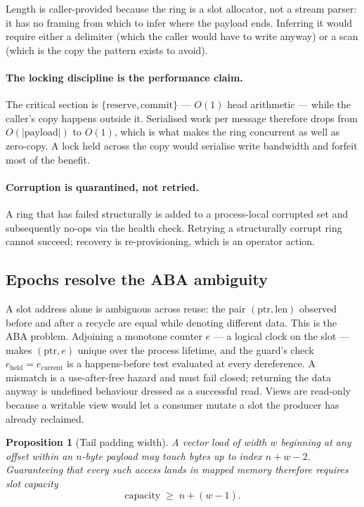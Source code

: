 \documentclass[11pt]{article}
\newtheorem{prop}{Proposition}[section]
\begin{document}
Length is caller-provided because the ring is a slot allocator, not a stream
parser: it has no framing from which to infer where the payload ends. Inferring
it would require either a delimiter (which the caller would have to write
anyway) or a scan (which is the copy the pattern exists to avoid).

\paragraph{The locking discipline is the performance claim.} The critical
section is $\{\mathrm{reserve}, \mathrm{commit}\}$ --- $O(1)$ head arithmetic
--- while the caller's copy happens outside it. Serialised work per message
therefore drops from $O(|\mathrm{payload}|)$ to $O(1)$, which is what makes the
ring concurrent as well as zero-copy. A lock held across the copy would
serialise write bandwidth and forfeit most of the benefit.

\paragraph{Corruption is quarantined, not retried.} A ring that has failed
structurally is added to a process-local corrupted set and subsequently
no-ops via the health check. Retrying a structurally corrupt ring cannot
succeed; recovery is re-provisioning, which is an operator action.

\subsection{Epochs resolve the ABA ambiguity}
\label{lbl:HS-MUT-05}

A slot address alone is ambiguous across reuse: the pair $(\mathrm{ptr},
\mathrm{len})$ observed before and after a recycle are equal while denoting
different data. This is the ABA problem. Adjoining a monotone counter
$e$ --- a logical clock on the slot --- makes $(\mathrm{ptr}, e)$ unique over
the process lifetime, and the guard's check $e_{\mathrm{held}} =
e_{\mathrm{current}}$ is a happens-before test evaluated at every dereference.
A mismatch is a use-after-free hazard and must fail closed; returning the data
anyway is undefined behaviour dressed as a successful read. Views are read-only
because a writable view would let a consumer mutate a slot the producer has
already reclaimed.

\begin{prop}[Tail padding width]
A vector load of width $w$ beginning at any offset within an $n$-byte payload
may touch bytes up to index $n + w - 2$. Guaranteeing that every such access
lands in mapped memory therefore requires slot capacity
\begin{equation}
\mathrm{capacity} \;\ge\; n + (w - 1).
\end{equation}
\end{prop}
\end{document}
